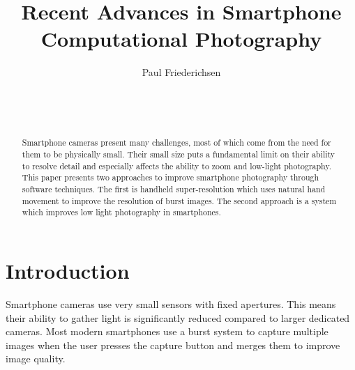 \documentclass{sig-alternate}
\begin{document}

\title{Recent Advances in Smartphone Computational Photography}


\author{
\alignauthor
Paul Friederichsen\\
	\\
	\\
	\\
}

\maketitle

\begin{abstract}

Smartphone cameras present many challenges, most of which come from the need for them to be physically small. Their small size puts a fundamental limit on their ability to resolve detail and especially affects the ability to zoom and low-light photography. This paper presents two approaches to improve smartphone photography through software techniques. The first is handheld super-resolution which uses natural hand movement to improve the resolution of burst images. The second approach is a system which improves low light photography in smartphones.

\end{abstract}


\section{Introduction}

Smartphone cameras use very small sensors with fixed apertures. This means their ability to gather light is significantly reduced compared to larger dedicated cameras. Most modern smartphones use a burst system to capture multiple images when the user presses the capture button and merges them to improve image quality. 
\end{document}
